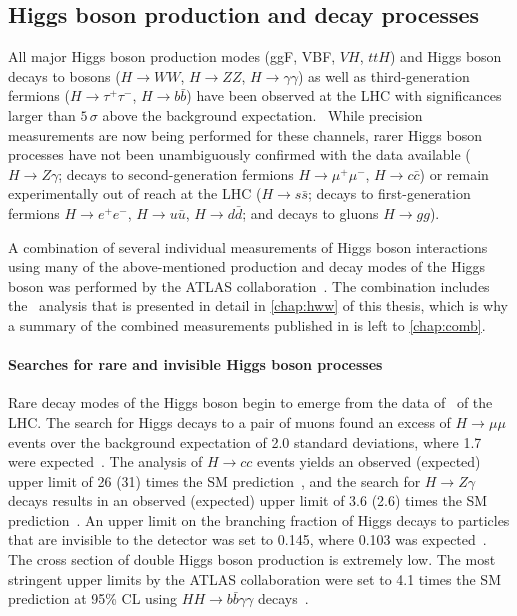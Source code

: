 \subsection{Higgs boson production and decay processes}
All major Higgs boson production modes (ggF, VBF, $VH$, $ttH$) and Higgs boson decays to bosons ($H \to WW$, $H \to ZZ$, $H \to \gamma\gamma$) as well as third-generation fermions ($H \to \tau^+\tau^-$, $H \to b\bar{b}$) have been observed at the LHC with significances larger than $5\,\sigma$ above the background expectation.~\cite{NaturePaper}
While precision measurements are now being performed for these channels, rarer Higgs boson processes have not been unambiguously confirmed with the data available ($H \to Z\gamma$; decays to second-generation fermions $H \to \mu^+\mu^-$, $H \to c\bar{c}$) or remain experimentally out of reach at the LHC ($H \to s\bar{s}$; decays to first-generation fermions $H \to e^+e^-$, $H \to u\bar{u}$, $H \to d\bar{d}$; and decays to gluons $H \to gg$).

A combination of several individual measurements of Higgs boson interactions using many of the above-mentioned production and decay modes of the Higgs boson was performed by the ATLAS collaboration~\cite{NaturePaper}.
The combination includes the \HWW\ analysis that is presented in detail in \cref{chap:hww} of this thesis, which is why a summary of the combined measurements published in  is left to \cref{chap:comb}. 

\paragraph{Searches for rare and invisible Higgs boson processes}
Rare decay modes of the Higgs boson begin to emerge from the data of \RunTwo\ of the LHC. 
The search for Higgs decays to a pair of muons found an excess of $H \to \mu\mu$ events over the background expectation of 2.0 standard deviations, where 1.7 were expected~\cite{HIGG-2019-14}.
The analysis of $H \to cc$ events yields an observed (expected) upper limit of 26 (31) times the SM prediction~\cite{ATLAS-CONF-2021-021}, and the search for $H \to Z\gamma$ decays results in an observed (expected) upper limit of 3.6 (2.6) times the SM prediction~\cite{HIGG-2018-42}.
An upper limit on the branching fraction of Higgs decays to particles that are invisible to the detector was set to 0.145, where 0.103 was expected~\cite{ATLASInvisible1}.
The cross section of double Higgs boson production is extremely low. The most stringent upper limits by the ATLAS collaboration were set to 4.1 times the SM prediction at 95\% CL using $HH \to b\bar{b}\gamma\gamma$ decays~\cite{ATLAS-CONF-2021-016}.

